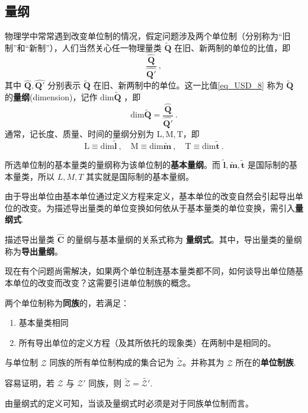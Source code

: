 \subsection{量纲}
物理学中常常遇到改变单位制的情况，假定问题涉及两个单位制（分别称为“旧制”和“新制”），人们当然关心任一物理量类 $\tilde{\boldsymbol{Q}}$ 在旧、新两制的单位的比值，即 
\begin{equation}\label{eq_USD_8}
\frac{\hat{\boldsymbol{Q}}}{\hat{\boldsymbol{Q'}}}~,
\end{equation}
其中 $\hat{\boldsymbol{Q}},\hat{\boldsymbol{Q'}}$ 分别表示 $\tilde{\boldsymbol{Q}}$ 在旧、新两制中的单位。这一比值\autoref{eq_USD_8} 称为 $\tilde{\boldsymbol{Q}}$ 的\textbf{量纲}(dimension)，记作 $\mathrm{dim}\tilde{\boldsymbol{Q}}$ ，即
\begin{equation}\label{eq_USD_9}
\mathrm{dim}\tilde{\boldsymbol{Q}}=\frac{\hat{\boldsymbol{Q}}}{\hat{\boldsymbol{Q'}}}~.
\end{equation}
通常，记长度、质量、时间的量纲分别为 $\mathrm{L},\mathrm{M},\mathrm{T}$，即
\begin{equation}
\mathrm{L}\equiv\mathrm{dim}\tilde{\boldsymbol{l}}~,\quad\mathrm{M}\equiv\mathrm{dim}\tilde{\boldsymbol{m}}~,\quad
\mathrm{T}\equiv\mathrm{dim}\tilde{\boldsymbol{t}}~.
\end{equation}

所选单位制的基本量类的量纲称为该单位制的\textbf{基本量纲}。而 $\tilde{\boldsymbol{l}},\tilde{\boldsymbol{m}},\tilde{\boldsymbol{t}}$ 是国际制的基本量类，所以 $L,M,T$ 其实就是国际制的基本量纲。

由于导出单位由基本单位通过定义方程来定义，基本单位的改变自然会引起导出单位的改变。为描述导出量类的单位变换如何依从于基本量类的单位变换，需引入\textbf{量纲式}.
\begin{definition}{}\label{def_USD_1}
描述导出量类 $\hat{\boldsymbol{C}}$ 的量纲与基本量纲的关系式称为 \textbf{量纲式}。其中，导出量类的量纲称为\textbf{导出量纲}。
\end{definition}

现在有个问题尚需解决，如果两个单位制连基本量类都不同，如何谈导出单位随基本单位的改变而改变？这需要引进单位制族的概念。
\begin{definition}{}\label{def_USD_2}
两个单位制称为\textbf{同族}的，若满足：
\begin{enumerate}
\item 基本量类相同 
\item 所有导出单位的定义方程（及其所依托的现象类）在两制中是相同的。
\end{enumerate}
\end{definition}
与单位制 $\mathscr{Z}$ 同族的所有单位制构成的集合记为 $\tilde{\mathscr{Z}}$。并称其为 $\mathscr{Z}$ 所在的\textbf{单位制族}.

容易证明，若 $\mathscr{Z}$ 与 $\mathscr{Z'}$ 同族，则 $\tilde{\mathscr{Z}}=\tilde{\mathscr{Z'}}$.

由量纲式的定义可知，当谈及量纲式时必须是对于同族单位制而言。
